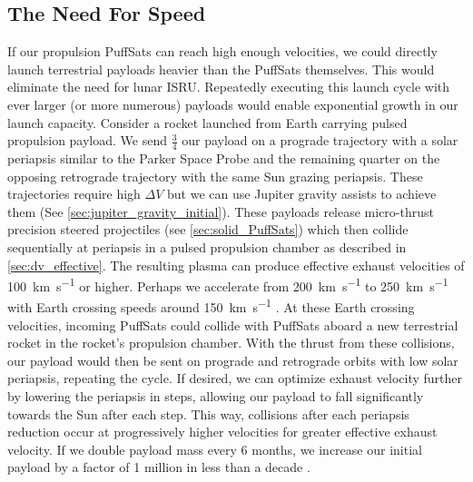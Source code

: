 \documentclass{article}
\begin{document}
{\subsection{The Need For Speed \cite{topgun1986needforspeed}}\label{sec:no_isru_rocket}
If our propulsion PuffSats can reach high enough velocities, we could directly launch terrestrial payloads heavier than the PuffSats themselves.   This would eliminate the need for lunar ISRU. Repeatedly executing this launch cycle with ever larger (or more numerous) payloads would enable exponential growth in our launch capacity. Consider a rocket launched from Earth carrying pulsed propulsion payload.   We send $\frac{3}{4}$ our payload on a prograde trajectory with a solar periapsis similar to the Parker Space Probe and the remaining quarter on the opposing retrograde trajectory with the same Sun grazing periapsis.  These trajectories require high $\Delta V$ but we can use Jupiter gravity assists to achieve them (See \autoref{sec:jupiter_gravity_initial}).   These payloads release micro-thrust precision steered projectiles (see \autoref{sec:solid_PuffSats}) which then collide sequentially at periapsis in a pulsed propulsion chamber as described in \autoref{sec:dv_effective}. The resulting plasma can produce effective exhaust velocities of \SI{100}{\kilo\meter\per\second} or higher. Perhaps we accelerate from \SI{200}{\kilo\meter\per\second} to \SI{250}{\kilo\meter\per\second} with Earth crossing speeds around \SI{150}{\kilo\meter\per\second} \cite{Katz_aim_is_all_you_need_2025}.  At these Earth crossing velocities, incoming PuffSats could collide with PuffSats aboard a new terrestrial rocket in the rocket's propulsion chamber.  With the thrust from these collisions, our payload would then be sent on prograde and retrograde orbits with low solar periapsis, repeating the cycle.  If desired, we can optimize exhaust velocity further by lowering the periapsis in steps, allowing our payload to fall significantly towards the Sun after each step.  This way, collisions after each periapsis reduction occur at progressively higher velocities for greater effective exhaust velocity.   If we double payload mass every 6 months, we increase our initial payload by a factor of 1 million in less than a decade \cite{Katz_aim_is_all_you_need_2025}. 

}
\end{document}
